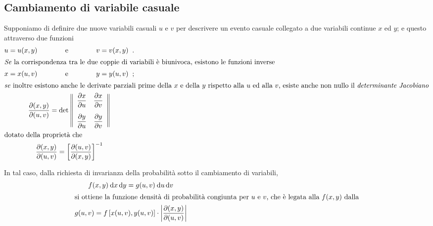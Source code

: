 \subsection{Cambiamento di variabile casuale}%
Supponiamo di definire due nuove variabili casuali $u$ e $v$
per descrivere un evento casuale collegato a due variabili
continue $x$ ed $y$; e questo attraverso due funzioni
\begin{gather*}
  u = u(x,y) \makebox[30mm]{e} v = v(x,y) \peq . \\
  \intertext{\emph{Se} la corrispondenza tra le due coppie
    di variabili \`e biunivoca, esistono le funzioni
    inverse}
  x = x(u,v) \makebox[30mm]{e} y = y(u,v) \peq ; \\
  \intertext{\emph{se} inoltre esistono anche le derivate
    parziali prime della $x$ e della $y$ rispetto alla $u$
    ed alla $v$, esiste anche non nullo il
    \emph{determinante Jacobiano}%
    \index{Jacobiano!determinante|(}}
  \frac{ \partial (x,y) }{ \partial (u,v) } = \det \left\|
    \begin{array}{cc}
      \dfrac{ \partial x }{ \partial u } & \dfrac{ \partial
        x }{ \partial v } \\[3ex]
      \dfrac{ \partial y }{ \partial u } & \dfrac{ \partial
        y }{ \partial v }
    \end{array} \right\| \\
  \intertext{dotato della propriet\`a che}
  \frac{ \partial (x,y) }{ \partial (u,v) } = \left[ \frac{
      \partial (u,v) }{ \partial (x,y) } \right]^{-1}
\end{gather*}%

In tal caso, dalla richiesta di invarianza della
probabilit\`a sotto il cambiamento di variabili,
\begin{gather}
  f(x,y) \: \mathrm{d} x \, \mathrm{d} y = g(u,v) \: \mathrm{d} u \, \mathrm{d} v \notag
  \\
  \intertext{si ottiene la funzione densit\`a di
    probabilit\`a congiunta per $u$ e $v$, che \`e legata
    alla $f(x,y)$ dalla}
  g(u,v) = f \left[ x(u,v), y(u,v) \right] \cdot \left|
    \frac{\partial (x,y)}{\partial (u,v)} \right|
  \label{eq:7.cavar2}
\end{gather}%

